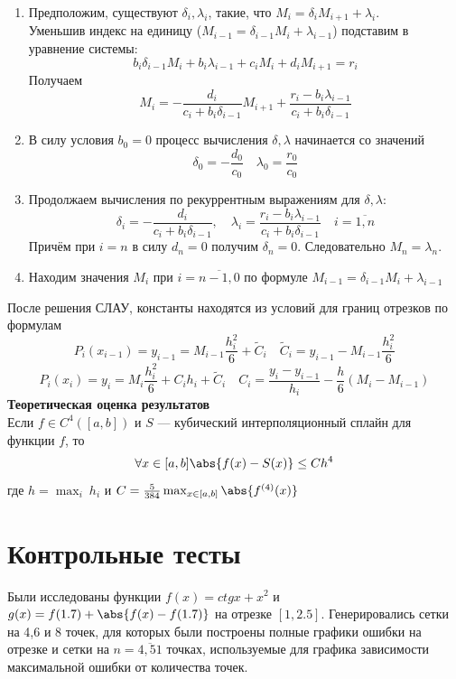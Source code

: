 \documentclass[a4paper]{article}
\begin{document}
\begin{enumerate}
  \item Предположим, существуют \(\delta_{i},\lambda_{i}\), такие, что \(M_{i} = \delta_{i}M_{i+1}+\lambda_{i}\).\\
        Уменьшив индекс на единицу (\(M_{i-1} = \delta_{i-1}M_{i} + \lambda_{i-1}\)) подставим в уравнение системы: \[
        b_{i}\delta_{i-1}M_{i} + b_{i}\lambda_{i-1}+c_{i}M_{i}+d_{i}M_{i+1} = r_{i}
        \]
        Получаем \[
        M_{i}=-\frac{d_{i}}{c_{i}+b_{i} \delta_{i-1}} M_{i+1}+\frac{r_{i}-b_{i} \lambda_{i-1}}{c_{i}+b_{i} \delta_{i-1}}
        \]
  \item В силу условия \(b_{0} = 0\) процесс вычисления \(\delta,\lambda\) начинается со значений \[
        \delta_{0} = -\frac{d_0}{c_0} \quad \lambda_{0} = \frac{r_{0}}{c_{0}}
        \]
  \item Продолжаем вычисления по рекуррентным выражениям для \(\delta,\lambda\): \[
        \delta_{i}=-\frac{d_{i}}{c_{i}+b_{i} \delta_{i-1}}, \quad \lambda_{i}=\frac{r_{i}-b_{i} \lambda_{i-1}}{c_{i}+b_{i} \delta_{i-1}} \quad i=\overline{1,n}
        \]
        Причём при \(i=n\) в силу \(d_{n} = 0\) получим \(\delta_{n}=0\). Следовательно \(M_{n} =\lambda_{n}\).
  \item Находим значения \(M_{i}\) при \(i=\overline{n-1,0}\) по формуле \(M_{i-1} = \delta_{i-1}M_{i} + \lambda_{i-1}\)
\end{enumerate}

После решения СЛАУ, константы находятся из условий для границ отрезков по формулам \[
  P_{i}(x_{i-1}) = y_{i-1} = M_{i-1} \frac{h_{i}^2}{6} + \tilde{C}_{i} \quad \tilde{C}_{i} = y_{i-1} - M_{i-1} \frac{h_{i}^2}{6}
\]\[
  P_{i}(x_{i}) = y_{i} = M_{i} \frac{h_{i}^2}{6} + C_{i}h_{i} + \tilde{C}_{i} \quad C_{i} = \frac{y_{i}-y_{i-1}}{h_{i}} - \frac{h}{6} (M_{i} - M_{i-1})
\]
\textbf{Теоретическая оценка результатов}\\
Если \(f \in C^{4}([a,b])\) и \(S\) --- кубический интерполяционный сплайн для функции \(f\), то \[
  \forall x \in [a,b] \abs{f(x)-S(x)} \leq Ch^{4}
\]
где \(h = \max_{i}\ h_{i}\) и \(C = \frac{5}{384} \max_{x\in[a,b]}\abs{f^{(4)}(x)}\)
\section{Контрольные тесты}\label{sec:tests}
Были исследованы  функции \(f(x) = ctg x + x^{2}\) и \(g(x) = f(1.7) + \abs{f(x) - f(1.7)}\) на отрезке \([1,2.5]\).
Генерировались сетки на 4,6 и 8 точек, для которых были построены полные графики ошибки на отрезке и сетки на
\(n = \overline{4,51}\) точках, используемые для графика зависимости максимальной ошибки от количества точек.
\end{document}
